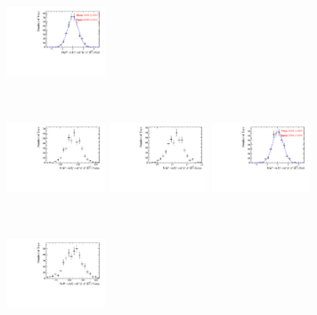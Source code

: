 \begin{figure}[!h]
\begin{subfigure}[t]{1.0\textwidth}
      \includegraphics[width=0.32\textwidth]{figs/B2DsPhi/Plots_DsKK_Pull_yield_peak_DsD0_Ds2KKPi_toy_both_DsBDTbin1_PhiBDTbin1_both_both.pdf}
      \caption{\decay{\Dsp}{\Kp\Km\pip}}
   \end{subfigure}\\
   \begin{subfigure}[t]{1.0\textwidth}
      \includegraphics[width=0.32\textwidth]{figs/B2DsPhi/Plots_DsKK_Value_yield_peak_DsD0_Ds2PiPiPi_toy_both_DsBDTbin1_PhiBDTbin1_both_both.pdf}
      \includegraphics[width=0.32\textwidth]{figs/B2DsPhi/Plots_DsKK_Error_yield_peak_DsD0_Ds2PiPiPi_toy_both_DsBDTbin1_PhiBDTbin1_both_both.pdf}
      \includegraphics[width=0.32\textwidth]{figs/B2DsPhi/Plots_DsKK_Pull_yield_peak_DsD0_Ds2PiPiPi_toy_both_DsBDTbin1_PhiBDTbin1_both_both.pdf}
      \caption{\decay{\Dsp}{\pip\pim\pip}}
   \end{subfigure}\\
   \begin{subfigure}[t]{1.0\textwidth}
      \includegraphics[width=0.32\textwidth]{figs/B2DsPhi/Plots_DsKK_Value_yield_peak_DsD0_Ds2KPiPi_toy_both_DsBDTbin1_PhiBDTbin1_both_both.pdf}

\end{subfigure}
\end{figure}
